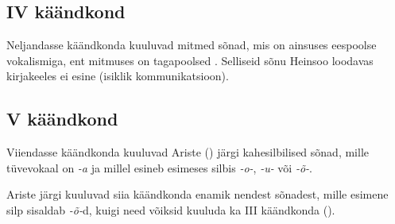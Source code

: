 \documentclass[12pt,a4paper]{article}
\newcommand{\vadja}[1]{\textit{#1}}
\begin{document}
\subsection{\RN{4} käändkond}

Neljandasse käändkonda kuuluvad mitmed sõnad, mis on ainsuses eespoolse vokalismiga, ent mitmuses on tagapoolsed \cite[43]{ariste_grammar_1968}. Selliseid sõnu Heinsoo loodavas kirjakeeles ei esine (isiklik kommunikatsioon). %


\subsection{\RN{5} käändkond}

Viiendasse käändkonda kuuluvad Ariste (\citeyear[44]{ariste_grammar_1968}) järgi kahe\-silbilised sõnad, mille tüve\-vokaal on \vadja{-a} ja millel esineb esimeses silbis \vadja{-o-}, \vadja{-u-} või \vadja{-õ-}.

Ariste järgi kuuluvad siia käändkonda enamik nendest sõnadest, mille esimene silp sisaldab \textit{-õ-}d, kuigi need võiksid kuuluda ka \RN{3} käändkonda (\citeyear[44]{ariste_grammar_1968}).

\end{document}
